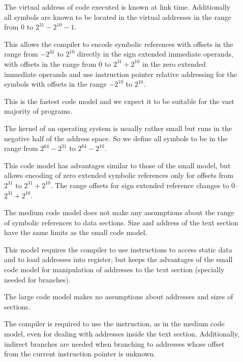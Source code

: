 \begin{description}
\item[]
  The virtual address of code executed is known at link time.
  Additionally all symbols are known to be located in the virtual
  addresses in the range from $0$ to $2^{31}-2^{10} - 1$.

  This allows the compiler to encode symbolic references with offsets
  in the range from $-2^{31}$ to $2^{10}$ directly in the sign
  extended immediate operands, with offsets in the range from $0$ to
  $2^{31}+2^{10}$ in the zero extended immediate operands and use
  instruction pointer relative addressing for the symbols with offsets
  in the range $-2^{10}$ to $2^{10}$.

  This is the fastest code model and we expect it to be suitable for
  the vast majority of programs.

\item[]

  The kernel of an operating system is usually rather small but runs
  in the negative half of the address space.  So we define all symbols
  to be in the range from $2^{64}-2^{31}$ to $2^{64}-2^{10}$.

  This code model has advantages similar to those of the small model,
  but allows encoding of zero extended symbolic references only for
  offsets from $2^{31}$ to $2^{31}+2^{10}$. The range offsets for
  sign extended reference changes to $0$--$2^{31}+2^{10}$.

\item[]

  The medium code model does not make any assumptions about the range
  of symbolic references to data sections. Size and address of the
  text section have the same limits as the small code model.

  This model requires the compiler to use  instructions
  to access static data and to load addresses into register, but keeps
  the advantages of the small code model for manipulation of addresses
  to the text section (specially needed for branches).

\item[]

  The large code model makes no assumptions about addresses and sizes
  of sections.

  The compiler is required to use the  instruction, as in
  the medium code model, even for dealing with addresses inside the
  text section.  Additionally, indirect branches are needed when
  branching to addresses whose offset from the current instruction
  pointer is unknown.


\end{description}
